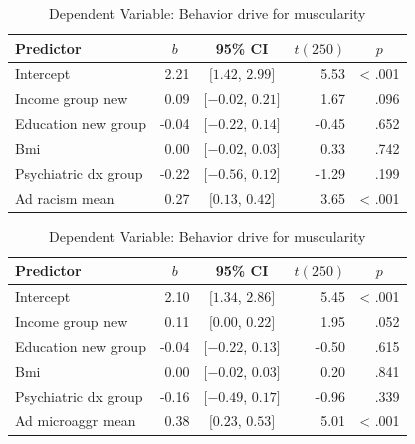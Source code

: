 \documentclass[
  english,
  man, fleqn, noextraspace,floatsintext]{apa6}
\begin{document}
\begin{table}[tbp]

\begin{center}
\begin{threeparttable}

\caption{\label{tab:regression-table}Dependent Variable: Behavior drive for muscularity}

\begin{tabular}{lrcrr}
\toprule
Predictor & \multicolumn{1}{c}{$b$} & \multicolumn{1}{c}{95\% CI} & \multicolumn{1}{c}{$t(250)$} & \multicolumn{1}{c}{$p$}\\
\midrule
Intercept & 2.21 & $[1.42$, $2.99]$ & 5.53 & < .001\\
Income group new & 0.09 & $[-0.02$, $0.21]$ & 1.67 & .096\\
Education new group & -0.04 & $[-0.22$, $0.14]$ & -0.45 & .652\\
Bmi & 0.00 & $[-0.02$, $0.03]$ & 0.33 & .742\\
Psychiatric dx group & -0.22 & $[-0.56$, $0.12]$ & -1.29 & .199\\
Ad racism mean & 0.27 & $[0.13$, $0.42]$ & 3.65 & < .001\\
\bottomrule
\end{tabular}

\end{threeparttable}
\end{center}

\end{table}

\begin{table}[tbp]

\begin{center}
\begin{threeparttable}

\caption{\label{tab:regression-table}Dependent Variable: Behavior drive for muscularity}

\begin{tabular}{lrcrr}
\toprule
Predictor & \multicolumn{1}{c}{$b$} & \multicolumn{1}{c}{95\% CI} & \multicolumn{1}{c}{$t(250)$} & \multicolumn{1}{c}{$p$}\\
\midrule
Intercept & 2.10 & $[1.34$, $2.86]$ & 5.45 & < .001\\
Income group new & 0.11 & $[0.00$, $0.22]$ & 1.95 & .052\\
Education new group & -0.04 & $[-0.22$, $0.13]$ & -0.50 & .615\\
Bmi & 0.00 & $[-0.02$, $0.03]$ & 0.20 & .841\\
Psychiatric dx group & -0.16 & $[-0.49$, $0.17]$ & -0.96 & .339\\
Ad microaggr mean & 0.38 & $[0.23$, $0.53]$ & 5.01 & < .001\\
\bottomrule
\end{tabular}

\end{threeparttable}
\end{center}

\end{table}
\end{document}
